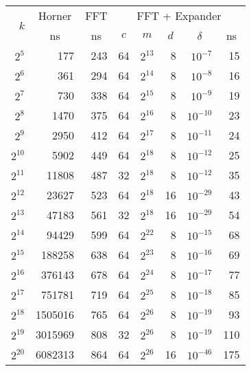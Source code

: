 \documentclass[a4paper,11pt]{article}
\theoremstyle{plain}
\theoremstyle{definition}
\begin{document}
\begin{table}[htpb]
	\centering
\begin{tabular}{rrr|rrrrr}
	
	\toprule
    
\multirow{2}{*}{$k$} & \multicolumn{1}{c}{Horner} & \multicolumn{1}{c|}{FFT}  & \multicolumn{5}{c}{FFT + Expander}       \\ 
           
& \multicolumn{1}{c}{ns} &   \multicolumn{1}{c|}{ns}  & \multicolumn{1}{c}{$c$} &  \multicolumn{1}{c}{$m$}    & \multicolumn{1}{c}{$d$} & \multicolumn{1}{c}{$\delta$}    & \multicolumn{1}{c}{ns}    \\ \midrule 
$2^{5}$    &       177 &  243  & 64 & $2^{13}$ &  8 & $10^{-7}$   &  15   \\    
$2^{6}$    &       361 &  294  & 64 & $2^{14}$ &  8 & $10^{-8}$   &  16   \\ 
$2^{7}$    &       730 &  338  & 64 & $2^{15}$ &  8 & $10^{-9}$   &  19   \\ 
$2^{8}$    &      1470 &  375  & 64 & $2^{16}$ &  8 & $10^{-10}$  &  23   \\ 
$2^{9}$    &      2950 &  412  & 64 & $2^{17}$ &  8 & $10^{-11}$  &  24   \\ 
$2^{10}$   &      5902 &  449  & 64 & $2^{18}$ &  8 & $10^{-12}$  &  25   \\ 
$2^{11}$   &     11808 &  487  & 32 & $2^{18}$ &  8 & $10^{-12}$  &  35   \\ 
$2^{12}$   &     23627 &  523  & 64 & $2^{18}$ & 16 & $10^{-29}$  &  43   \\ 
$2^{13}$   &     47183 &  561  & 32 & $2^{18}$ & 16 & $10^{-29}$  &  54   \\ 
$2^{14}$   &     94429 &  599  & 64 & $2^{22}$ &  8 & $10^{-15}$  &  68   \\ 
$2^{15}$   &    188258 &  638  & 64 & $2^{23}$ &  8 & $10^{-16}$  &  69   \\ 
$2^{16}$   &    376143 &  678  & 64 & $2^{24}$ &  8 & $10^{-17}$  &  77   \\ 
$2^{17}$   &    751781 &  719  & 64 & $2^{25}$ &  8 & $10^{-18}$  &  85   \\ 
$2^{18}$   &   1505016 &  765  & 64 & $2^{26}$ &  8 & $10^{-19}$  &  93   \\ 
$2^{19}$   &   3015969 &  808  & 32 & $2^{26}$ &  8 & $10^{-19}$  & 110   \\ 
$2^{20}$   &   6082313 &  864  & 64 & $2^{26}$ & 16 & $10^{-46}$  & 175   \\ \bottomrule


\end{tabular}
\end{table}
\end{document}

